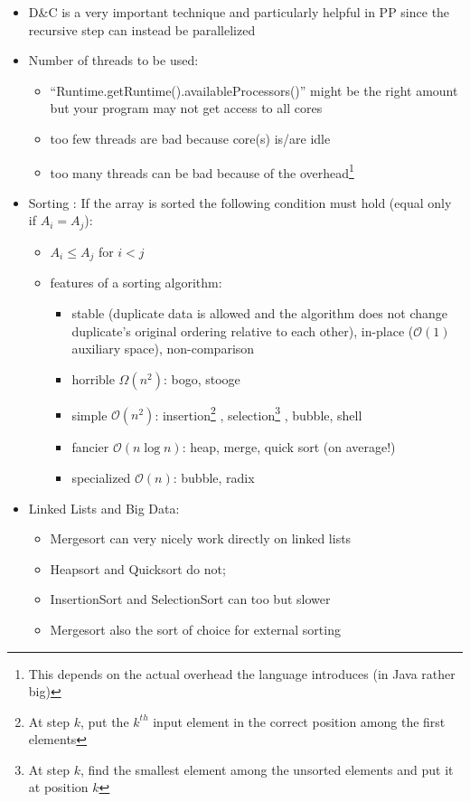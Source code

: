 \documentclass[a4paper]{article}
\begin{document}
\begin{itemize}
\item D\&C is a very important technique and particularly helpful in PP since the recursive step can instead be parallelized
\item Number of threads to be used: 
\begin{itemize}
\item ``Runtime.getRuntime().availableProcessors()'' might be the right amount but your program may not get access to all cores
\item too few threads are bad because core(s) is/are idle
\item too many threads can be bad because of the overhead\footnote{This depends on the actual overhead the language introduces (in Java rather big)}
\end{itemize}
\item Sorting : If the array is sorted the following condition must hold (equal only if $A_i=A_j$): 
\begin{itemize}
\item $A_i\leq A_j$  for $i<j$
\item features of a sorting algorithm:
\begin{itemize}
\item stable (duplicate data is allowed and the algorithm does not change duplicate's original ordering relative to each other), in-place ($\mathcal{O}(1)$ auxiliary space), non-comparison
\item horrible $\Omega(n^2 )$: bogo, stooge
\item simple $\mathcal{O}(n^2 )$: insertion\footnote{At step $k$, put the $k^{th}$ input element in the correct position among the first elements} , selection\footnote{At step $k$, find the smallest element among the unsorted elements and put it at position $k$} , bubble, shell
\item fancier $\mathcal{O}(n \log⁡ n )$: heap, merge, quick sort (on average!)
\item specialized $\mathcal{O}(n)$: bubble, radix
\end{itemize}
\end{itemize}
\item Linked Lists and Big Data: 
\begin{itemize}
\item Mergesort can very nicely work directly on linked lists
\item Heapsort and Quicksort do not;
\item InsertionSort and SelectionSort can too but slower
\item Mergesort also the sort of choice for external sorting

\end{itemize}
\end{itemize}
\end{document}
